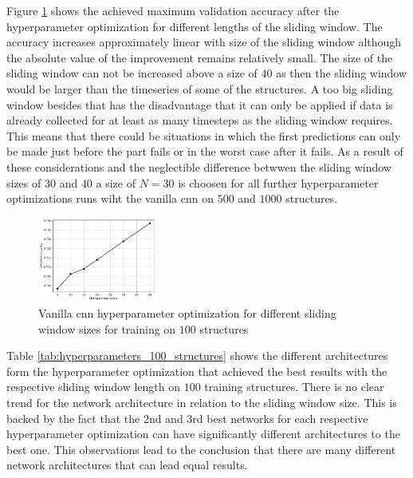 \documentclass[conference]{IEEEtran}
\begin{document}
Figure \ref{fig:influence_sequence_length_cnn} shows the achieved maximum validation accuracy after the hyperparameter optimization for different lengths of the sliding window. The accuracy increases approximately linear with size of the sliding window although the absolute value of the improvement remains relatively small. The size of the sliding window can not be increased above a size of $ 40 $ as then the sliding window would be larger than the timeseries of some of the structures. A too big sliding window besides that has the disadvantage that it can only be applied if data is already collected for at least as many timesteps as the sliding window requires. This means that there could be situations in which the first predictions can only be made just before the part fails or in the worst case after it fails. As a result of these considerations and the neglectible difference betwwen the sliding window sizes of $ 30 $ and $ 40 $ a size of $ N = 30 $ is choosen for all further hyperparameter optimizations runs wiht the vanilla \gls{cnn} on $ 500 $ and $ 1000 $ structures.

\begin{figure}[htp]
	\centering
	\includegraphics[width=0.35\textwidth]{python/influence_sequence_length_cnn.pdf}
	\caption{Vanilla \gls{cnn} hyperparameter optimization for different sliding window sizes for training on $ 100 $ structures}
	\label{fig:influence_sequence_length_cnn}
\end{figure}

Table \ref{tab:hyperparameters_100_structures} shows the different architectures form the hyperparameter optimization that achieved the best results with the respective sliding window length on $ 100 $ training structures. There is no clear trend for the network architecture in relation to the sliding window size. This is backed by the fact that the 2nd and 3rd best networks for each respective hyperparameter optimization can have significantly different architectures to the best one. This observations lead to the conclusion that there are many different network architectures that can lead equal results.
\end{document}
